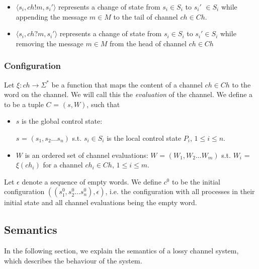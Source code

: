 \begin{itemize}
\item[]
$\langle s_i, ch!m, s_i'\rangle$ represents a change of state from $s_i \in S_i$ to $s_i'$ $\in S_i$ while appending the message $m\in M$ to the tail of channel $ch\in Ch$.
\item[]
$\langle s_i, ch?m, s_i'\rangle$ represents a change of state from $s_i\in S_i$ to $s_i'\in S_i$ while removing the message $m\in M$ from the head of channel $ch \in Ch$
\end{itemize}

\subsubsection{Configuration}
Let $\xi : ch \rightarrow \Sigma^*$ be a function that maps the content of a channel $ch \in Ch$ to the word on the channel. We will call this the \emph{evaluation} of the channel. We define a  to be a tuple $C$ = $(s, W)$, such that

\begin{itemize}
  \item $s$ is the global control state:

   $s$ = $(s_1, s_2... s_n)$ s.t. $s_i \in S_i$ is the local control state $P_i$, $1 \leq i \leq n$.
  \item $W$ is an ordered set of channel evaluations: $W$ = $(W_1, W_2...W_m)$ s.t. $W_i$ = $\xi(ch_i)$ for a channel $ch_i \in Ch$, $1 \leq i \leq m$.
\end{itemize}

Let $\epsilon$ denote a sequence of empty words. We define $c^0$ to be the initial configuration $((s_1^0, s_2^0...s_n^0), \epsilon)$, i.e. the configuration with all processes in their initial state and all channel evaluations being the empty word.

\subsection{Semantics}
In the following section, we explain the semantics of a lossy channel system, which describes the behaviour of the system.

